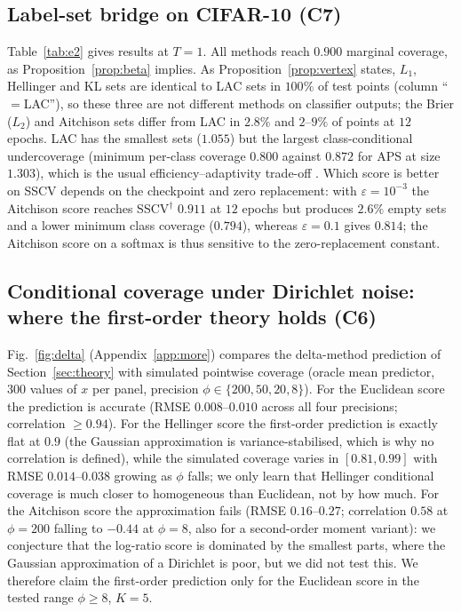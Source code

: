 \subsection{Label-set bridge on CIFAR-10 (C7)}
Table~\ref{tab:e2} gives results at $T=1$. All methods reach $0.900$ marginal coverage, as Proposition~\ref{prop:beta} implies. As Proposition~\ref{prop:vertex} states, $L_1$, Hellinger and KL sets are identical to LAC sets in $100\%$ of test points (column ``$=$LAC''), so these three are not different methods on classifier outputs; the Brier ($L_2$) and Aitchison sets differ from LAC in $2.8\%$ and $2$--$9\%$ of points at $12$ epochs. LAC has the smallest sets ($1.055$) but the largest class-conditional undercoverage (minimum per-class coverage $0.800$ against $0.872$ for APS at size $1.303$), which is the usual efficiency--adaptivity trade-off \citep{angelopoulos2021raps}. Which score is better on SSCV depends on the checkpoint and zero replacement: with $\varepsilon=10^{-3}$ the Aitchison score reaches SSCV$^\dagger$ $0.911$ at $12$ epochs but produces $2.6\%$ empty sets and a lower minimum class coverage ($0.794$), whereas $\varepsilon=0.1$ gives $0.814$; the Aitchison score on a softmax is thus sensitive to the zero-replacement constant.
\begin{table}[tbp]
\centering\small
\caption{CIFAR-10 label sets, $T=1$, $n_{\mathrm{cal}}=1000$, $200$ random calibration/test splits of the $10{,}000$ test images; mean $\pm$ half-width of the $95\%$ $t$-interval over splits. SSCV$^\dagger$: minimum coverage over size strata $\{1\},\{2\text{--}3\},\{4{+}\}$ (strata with fewer than $30$ points dropped). ``$=$LAC'': share of test points whose set equals the LAC set.}\label{tab:e2}
\resizebox{\linewidth}{!}{}
\end{table}

\subsection{Conditional coverage under Dirichlet noise: where the first-order theory holds (C6)}
Fig.~\ref{fig:delta} (Appendix~\ref{app:more}) compares the delta-method prediction of Section~\ref{sec:theory} with simulated pointwise coverage (oracle mean predictor, $300$ values of $x$ per panel, precision $\phi\in\{200,50,20,8\}$). For the Euclidean score the prediction is accurate (RMSE $0.008$--$0.010$ across all four precisions; correlation $\ge0.94$). For the Hellinger score the first-order prediction is exactly flat at $0.9$ (the Gaussian approximation is variance-stabilised, which is why no correlation is defined), while the simulated coverage varies in $[0.81,0.99]$ with RMSE $0.014$--$0.038$ growing as $\phi$ falls; we only learn that Hellinger conditional coverage is much closer to homogeneous than Euclidean, not by how much. For the Aitchison score the approximation fails (RMSE $0.16$--$0.27$; correlation $0.58$ at $\phi=200$ falling to $-0.44$ at $\phi=8$, also for a second-order moment variant): we conjecture that the log-ratio score is dominated by the smallest parts, where the Gaussian approximation of a Dirichlet is poor, but we did not test this. We therefore claim the first-order prediction only for the Euclidean score in the tested range $\phi\ge8$, $K=5$.

